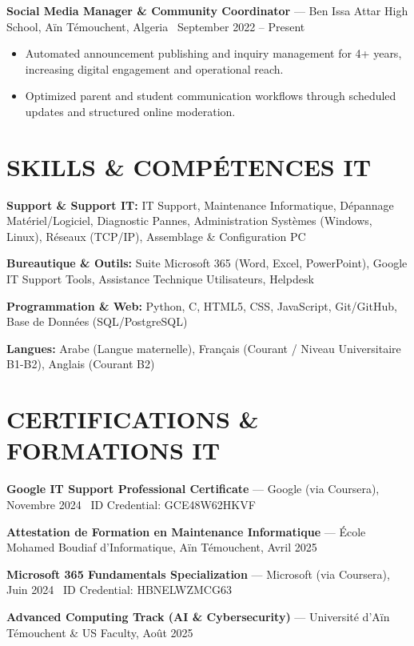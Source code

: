 \documentclass[10.5pt, letterpaper]{article}
\newcommand{\entry}[4]{%
  \noindent\textbf{#1} --- #3, #4 \textbar\ #2\par
  \vspace{2pt}
}
\newcommand{\resumeItem}[1]{\item #1}
\begin{document}
\entry{Social Media Manager \& Community Coordinator}{September 2022 -- Present}{Ben Issa Attar High School}{Aïn Témouchent, Algeria}
\begin{itemize}
  \resumeItem{Automated announcement publishing and inquiry management for 4+ years, increasing digital engagement and operational reach.}
  \resumeItem{Optimized parent and student communication workflows through scheduled updates and structured online moderation.}
\end{itemize}

\section{SKILLS \& COMPÉTENCES IT}
\noindent\textbf{Support \& Support IT:} IT Support, Maintenance Informatique, Dépannage Matériel/Logiciel, Diagnostic Pannes, Administration Systèmes (Windows, Linux), Réseaux (TCP/IP), Assemblage & Configuration PC\par
\noindent\textbf{Bureautique \& Outils:} Suite Microsoft 365 (Word, Excel, PowerPoint), Google IT Support Tools, Assistance Technique Utilisateurs, Helpdesk\par
\noindent\textbf{Programmation \& Web:} Python, C, HTML5, CSS, JavaScript, Git/GitHub, Base de Données (SQL/PostgreSQL)\par
\noindent\textbf{Langues:} Arabe (Langue maternelle), Français (Courant / Niveau Universitaire B1-B2), Anglais (Courant B2)

\section{CERTIFICATIONS \& FORMATIONS IT}
\noindent\textbf{Google IT Support Professional Certificate} --- Google (via Coursera), Novembre 2024 \textbar\ ID Credential: GCE48W62HKVF\par
\noindent\textbf{Attestation de Formation en Maintenance Informatique} --- École Mohamed Boudiaf d'Informatique, Aïn Témouchent, Avril 2025\par
\noindent\textbf{Microsoft 365 Fundamentals Specialization} --- Microsoft (via Coursera), Juin 2024 \textbar\ ID Credential: HBNELWZMCG63\par
\noindent\textbf{Advanced Computing Track (AI \& Cybersecurity)} --- Université d'Aïn Témouchent \& US Faculty, Août 2025\par
\end{document}
